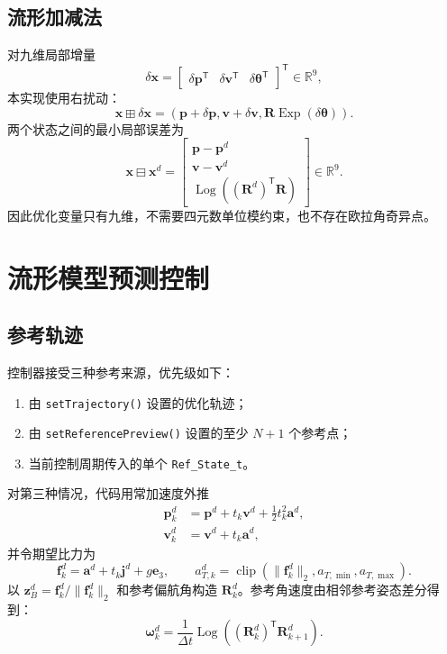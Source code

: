 \documentclass[UTF8,a4paper,11pt]{ctexart}
\newcommand{\R}{\mathbb{R}}
\newcommand{\Exp}{\operatorname{Exp}}
\newcommand{\Log}{\operatorname{Log}}
\newcommand{\clip}{\operatorname{clip}}
\begin{document}
\subsection{流形加减法}

对九维局部增量
\begin{equation}
  \delta\bm x=
  \begin{bmatrix}
    \delta\bm p^\mathsf T&
    \delta\bm v^\mathsf T&
    \delta\bm\theta^\mathsf T
  \end{bmatrix}^{\mathsf T}\in\R^9,
\end{equation}
本实现使用右扰动：
\begin{equation}
  \bm x\boxplus\delta\bm x=
  \left(
    \bm p+\delta\bm p,
    \bm v+\delta\bm v,
    \bm R\Exp(\delta\bm\theta)
  \right).
  \label{eq:boxplus}
\end{equation}
两个状态之间的最小局部误差为
\begin{equation}
  \bm x\boxminus\bm x^d=
  \begin{bmatrix}
    \bm p-\bm p^d\\
    \bm v-\bm v^d\\
    \Log\!\left((\bm R^d)^\mathsf T\bm R\right)
  \end{bmatrix}\in\R^9.
  \label{eq:boxminus}
\end{equation}
因此优化变量只有九维，不需要四元数单位模约束，也不存在欧拉角奇异点。

\section{流形模型预测控制}

\subsection{参考轨迹}

控制器接受三种参考来源，优先级如下：
\begin{enumerate}
  \item 由 \texttt{setTrajectory()} 设置的优化轨迹；
  \item 由 \texttt{setReferencePreview()} 设置的至少 $N+1$ 个参考点；
  \item 当前控制周期传入的单个 \texttt{Ref\_State\_t}。
\end{enumerate}

对第三种情况，代码用常加速度外推
\begin{align}
  \bm p_k^d &= \bm p^d+t_k\bm v^d+\frac{1}{2}t_k^2\bm a^d,\\
  \bm v_k^d &= \bm v^d+t_k\bm a^d,
\end{align}
并令期望比力为
\begin{equation}
  \bm f_k^d=\bm a^d+t_k\bm j^d+g\bm e_3,
  \qquad a_{T,k}^d=\clip
  \left(\lVert\bm f_k^d\rVert_2,a_{T,\min},a_{T,\max}\right).
\end{equation}
以 $\bm z_B^d=\bm f_k^d/\lVert\bm f_k^d\rVert_2$ 和参考偏航角构造
$\bm R_k^d$。参考角速度由相邻参考姿态差分得到：
\begin{equation}
  \bm\omega_k^d=\frac{1}{\Delta t}
  \Log\!\left((\bm R_k^d)^\mathsf T\bm R_{k+1}^d\right).
\end{equation}
\end{document}
